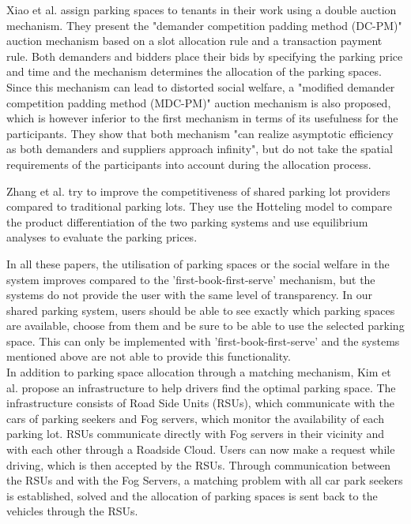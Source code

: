 Xiao et al. \cite{xiao2018shared} assign parking spaces to tenants in their work using a double auction mechanism. They present the "demander competition padding method (DC-PM)" auction mechanism based on a slot allocation rule and a transaction payment rule. Both demanders and bidders place their bids by specifying the parking price and time and the mechanism determines the allocation of the parking spaces. Since this mechanism can lead to distorted social welfare, a "modified demander competition padding method (MDC-PM)" auction mechanism is also proposed, which is however inferior to the first mechanism in terms of its usefulness for the participants. They show that both mechanism "can realize asymptotic efficiency as both demanders and suppliers approach infinity", but do not take the spatial requirements of the participants into account during the allocation process. 

Zhang et al. \cite{zhang2019pricing} try to improve the competitiveness of shared parking lot providers compared to traditional parking lots. They use the Hotteling model to compare the product differentiation of the two parking systems and use equilibrium analyses to evaluate the parking prices. 

In all these papers, the utilisation of parking spaces or the social welfare in the system improves compared to the 'first-book-first-serve' mechanism, but the systems do not provide the user with the same level of transparency. In our shared parking system, users should be able to see exactly which parking spaces are available, choose from them and be sure to be able to use the selected parking space. This can only be implemented with 'first-book-first-serve' and the systems mentioned above are not able to provide this functionality.\\

In addition to parking space allocation through a matching mechanism, Kim et al. \cite{Kim2015ASP} propose an infrastructure to help drivers find the optimal parking space. The infrastructure consists of Road Side Units (RSUs), which communicate with the cars of parking seekers and Fog servers, which monitor the availability of each parking lot. RSUs communicate directly with Fog servers in their vicinity and with each other through a Roadside Cloud. Users can now make a request while driving, which is then accepted by the RSUs. Through communication between the RSUs and with the Fog Servers, a matching problem with all car park seekers is established, solved and the allocation of parking spaces is sent back to the vehicles through the RSUs. 

